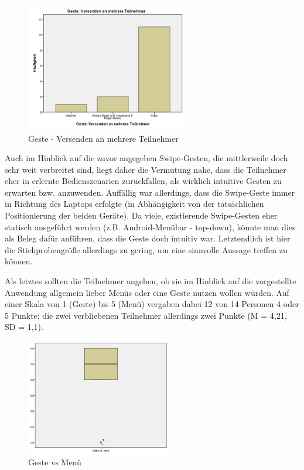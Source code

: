 \documentclass{chi-ext}
\begin{document}
\begin{figure}
  \centering
  \includegraphics[width=200pt]{img/studie/Antworten_Geste_Multicast.jpg}
  \caption{Geste - Versenden an mehrere Teilnehmer}
  \label{fig:studie_Antworten_Geste_Multicast}
\end{figure}


Auch im Hinblick auf die zuvor angegeben Swipe-Gesten, die mittlerweile doch sehr weit verbreitet sind, liegt daher die Vermutung nahe, dass die Teilnehmer eher in erlernte Bedienszenarien zurückfallen, als wirklich intuitive Gesten zu erwarten bzw. anzuwenden. Auffällig war allerdings, dass die Swipe-Geste immer in Richtung des Laptops erfolgte (in Abhängigkeit von der tatsächlichen Positionierung der beiden Geräte). Da viele, existierende Swipe-Gesten eher statisch ausgeführt werden (z.B. Android-Menübar - top-down), könnte man dies als Beleg dafür anführen, dass die Geste doch intuitiv war. Letztendlich ist hier die Stichprobengröße allerdings zu gering, um eine sinnvolle Aussage treffen zu können.

Als letztes sollten die Teilnehmer angeben, ob sie im Hinblick auf die vorgestellte Anwendung allgemein lieber Menüs oder eine Geste nutzen wollen würden. Auf einer Skala von 1 (Geste) bis 5 (Menü) vergaben dabei 12 von 14 Personen 4 oder 5 Punkte; die zwei verbliebenen Teilnehmer allerdings zwei Punkte (M = 4,21, SD = 1,1). 

\begin{figure}
  \centering
  \includegraphics[width=180pt]{img/studie/Geste_vs_Menu.jpg}
  \caption{Geste vs Menü}
  \label{fig:studie_Geste_vs_Menu}
\end{figure}
\end{document}
